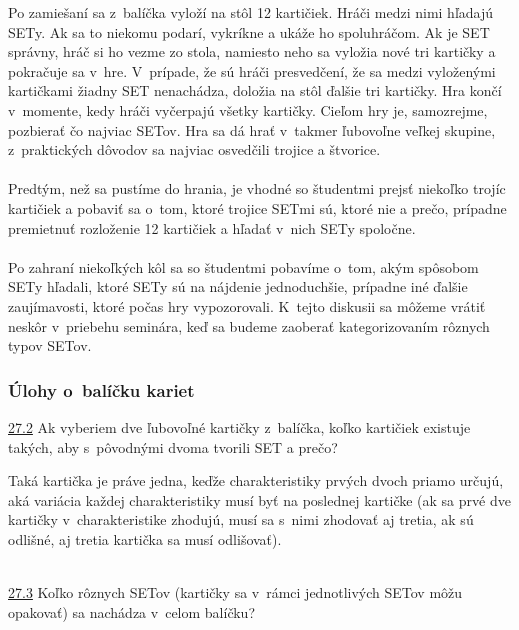 {Po zamiešaní sa z~balíčka vyloží na stôl 12 kartičiek. Hráči medzi nimi hľadajú SETy. Ak sa to niekomu podarí, vykríkne  a ukáže ho spoluhráčom. Ak je SET správny, hráč si ho vezme zo stola, namiesto neho sa vyložia nové tri kartičky a pokračuje sa v~hre. V~prípade, že sú hráči presvedčení, že sa medzi vyloženými kartičkami žiadny SET nenachádza, doložia na stôl ďalšie tri kartičky. Hra končí v~momente, kedy hráči vyčerpajú všetky kartičky. Cieľom hry je, samozrejme, pozbierať čo najviac SETov. Hra sa dá hrať v~takmer ľubovoľne veľkej skupine, z~praktických dôvodov sa najviac osvedčili trojice a štvorice.\\
\\
\kom Predtým, než sa pustíme do hrania, je vhodné so študentmi prejsť niekoľko trojíc kartičiek a pobaviť sa o~tom, ktoré trojice SETmi sú, ktoré nie a prečo, prípadne premietnuť rozloženie 12 kartičiek a hľadať v~nich SETy spoločne. \\
\\
Po zahraní niekoľkých kôl sa so študentmi pobavíme o~tom, akým spôsobom SETy hľadali, ktoré SETy sú na nájdenie jednoduchšie, prípadne iné ďalšie zaujímavosti, ktoré počas hry vypozorovali. K~tejto diskusii sa môžeme vrátiť neskôr v~priebehu seminára, keď sa budeme zaoberať kategorizovaním rôznych typov SETov.

\subsubsection*{Úlohy o~balíčku kariet}
\begin{tcolorbox}[breakable,notitle,boxrule=0pt,colback=light-gray,colframe=light-gray]\ul{27.2} Ak vyberiem dve ľubovoľné kartičky z~balíčka, koľko kartičiek existuje takých, aby s~pôvodnými dvoma tvorili SET a prečo? \end{tcolorbox}

\rie Taká kartička je práve jedna, keďže charakteristiky prvých dvoch priamo určujú, aká variácia každej charakteristiky musí byť na poslednej kartičke (ak sa prvé dve kartičky v~charakteristike zhodujú, musí sa s~nimi zhodovať aj tretia, ak sú odlišné, aj tretia kartička sa musí odlišovať).\\
\\
\begin{tcolorbox}[breakable,notitle,boxrule=0pt,colback=light-gray,colframe=light-gray]\ul{27.3} Koľko rôznych SETov (kartičky sa v~rámci jednotlivých SETov môžu opakovať) sa nachádza v~celom balíčku?\end{tcolorbox}

}
